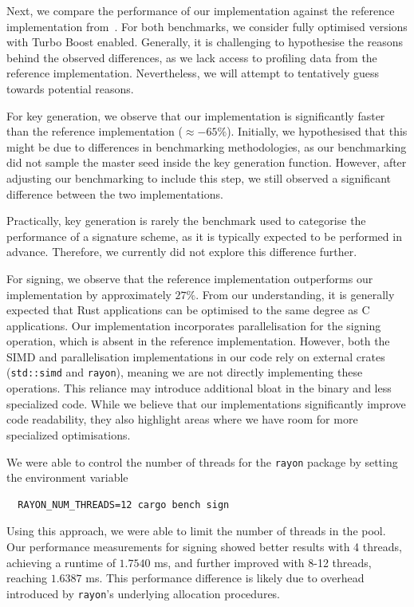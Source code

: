 \documentclass[11pt]{report}
\theoremstyle{definition}
\theoremstyle{plain}
\begin{document}
Next, we compare the performance of our implementation against the reference implementation from~\cite{aguilarsyndrome11}. For both benchmarks, we consider fully optimised versions with Turbo Boost enabled. Generally, it is challenging to hypothesise the reasons behind the observed differences, as we lack access to profiling data from the reference implementation. Nevertheless, we will attempt to tentatively guess towards potential reasons.

For key generation, we observe that our implementation is significantly faster than the reference implementation ($\approx -65\%$). Initially, we hypothesised that this might be due to differences in benchmarking methodologies, as our benchmarking did not sample the master seed inside the key generation function. However, after adjusting our benchmarking to include this step, we still observed a significant difference between the two implementations.

Practically, key generation is rarely the benchmark used to categorise the performance of a signature scheme, as it is typically expected to be performed in advance. Therefore, we currently did not explore this difference further.

For signing, we observe that the reference implementation outperforms our implementation by approximately $27\%$. From our understanding, it is generally expected that Rust applications can be optimised to the same degree as C applications. Our implementation incorporates parallelisation for the signing operation, which is absent in the reference implementation. However, both the SIMD and parallelisation implementations in our code rely on external crates (\texttt{std::simd} and \texttt{rayon}), meaning we are not directly implementing these operations. This reliance may introduce additional bloat in the binary and less specialized code. While we believe that our implementations significantly improve code readability, they also highlight areas where we have room for more specialized optimisations.

We were able to control the number of threads for the \texttt{rayon} package by setting the environment variable

\begin{verbatim}
  RAYON_NUM_THREADS=12 cargo bench sign
\end{verbatim}

Using this approach, we were able to limit the number of threads in the pool. Our performance measurements for signing showed better results with 4 threads, achieving a runtime of $1.7540$ ms, and further improved with 8-12 threads, reaching $1.6387$ ms. This performance difference is likely due to overhead introduced by \texttt{rayon}'s underlying allocation procedures.
\end{document}

